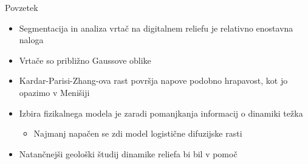 \documentclass{beamer}
\begin{document}
\begin{frame}{Povzetek}
  \begin{itemize}
  \item<1->
    Segmentacija in analiza vrtač na digitalnem reliefu je relativno enostavna naloga
  \item<2->
    Vrtače so približno Gaussove oblike
  \item<3->
    Kardar-Parisi-Zhang-ova rast površja napove podobno hrapavost, kot jo opazimo v Menišiji
  \item<4->
    Izbira fizikalnega modela je zaradi pomanjkanja informacij o dinamiki težka
    \begin{itemize}
      \item<5->
        Najmanj napačen se zdi model logistične difuzijske rasti
    \end{itemize}
    \item<6->
      Natančnejši geološki študij dinamike reliefa bi bil v pomoč
  \end{itemize}
\end{frame}

\end{document}
